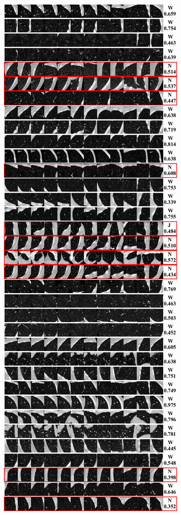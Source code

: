 \documentclass[onecolumn]{IEEEtran}
\begin{document}
\begin{figure}[H]
{\includegraphics[width=0.45\columnwidth]{./images/elcap-nodules-iso1}
}
\end{figure}
\end{document}
